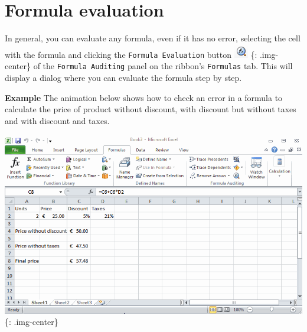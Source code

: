 \section{Formula evaluation}
\label{anameformula_evaluationaformulaevaluation}

In general, you can evaluate any formula, even if it has no error, selecting the cell with the formula and clicking the \texttt{Formula Evaluation} button \includegraphics[keepaspectratio,width=\textwidth,height=0.75\textheight]{img/button_evaluate_formula.png}
\{: .img-center\} of the \texttt{Formula Auditing} panel on the ribbon's \texttt{Formulas} tab. This will display a dialog where you can evaluate the formula step by step.

\textbf{Example} The animation below shows how to check an error in a formula to calculate the price of product without discount, with discount but without taxes and with discount and taxes.

\includegraphics[keepaspectratio,width=\textwidth,height=0.75\textheight]{img/example_formula_evaluation.gif}
\{: .img-center\}
